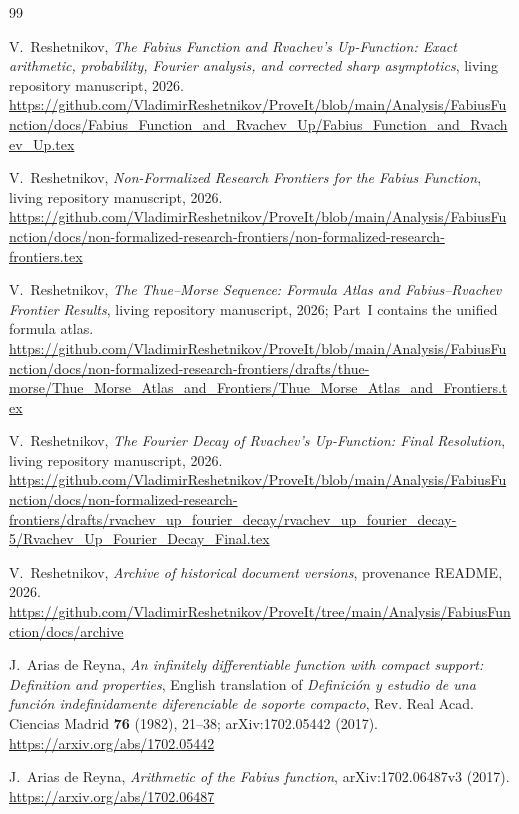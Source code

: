 \documentclass[11pt,oneside]{article}
\numberwithin{equation}{section}
\theoremstyle{definition}
\theoremstyle{remark}
\begin{document}
\begin{thebibliography}{99}

V.~Reshetnikov,
\emph{The Fabius Function and Rvachev's Up-Function: Exact arithmetic, probability, Fourier
analysis, and corrected sharp asymptotics}, living repository manuscript, 2026.
\url{https://github.com/VladimirReshetnikov/ProveIt/blob/main/Analysis/FabiusFunction/docs/Fabius_Function_and_Rvachev_Up/Fabius_Function_and_Rvachev_Up.tex}

V.~Reshetnikov,
\emph{Non-Formalized Research Frontiers for the Fabius Function}, living repository
manuscript, 2026.
\url{https://github.com/VladimirReshetnikov/ProveIt/blob/main/Analysis/FabiusFunction/docs/non-formalized-research-frontiers/non-formalized-research-frontiers.tex}

V.~Reshetnikov,
\emph{The Thue--Morse Sequence: Formula Atlas and Fabius--Rvachev Frontier Results}, living
repository manuscript, 2026; Part~I contains the unified formula atlas.
\url{https://github.com/VladimirReshetnikov/ProveIt/blob/main/Analysis/FabiusFunction/docs/non-formalized-research-frontiers/drafts/thue-morse/Thue_Morse_Atlas_and_Frontiers/Thue_Morse_Atlas_and_Frontiers.tex}

V.~Reshetnikov,
\emph{The Fourier Decay of Rvachev's Up-Function: Final Resolution}, living repository
manuscript, 2026.
\url{https://github.com/VladimirReshetnikov/ProveIt/blob/main/Analysis/FabiusFunction/docs/non-formalized-research-frontiers/drafts/rvachev_up_fourier_decay/rvachev_up_fourier_decay-5/Rvachev_Up_Fourier_Decay_Final.tex}

V.~Reshetnikov,
\emph{Archive of historical document versions}, provenance README, 2026.
\url{https://github.com/VladimirReshetnikov/ProveIt/tree/main/Analysis/FabiusFunction/docs/archive}

J.~Arias de Reyna,
\emph{An infinitely differentiable function with compact support: Definition and properties},
English translation of \emph{Definici\'on y estudio de una funci\'on indefinidamente
diferenciable de soporte compacto}, Rev. Real Acad. Ciencias Madrid \textbf{76} (1982),
21--38; arXiv:1702.05442 (2017).
\url{https://arxiv.org/abs/1702.05442}

J.~Arias de Reyna,
\emph{Arithmetic of the Fabius function}, arXiv:1702.06487v3 (2017).
\url{https://arxiv.org/abs/1702.06487}


\end{thebibliography}
\end{document}
